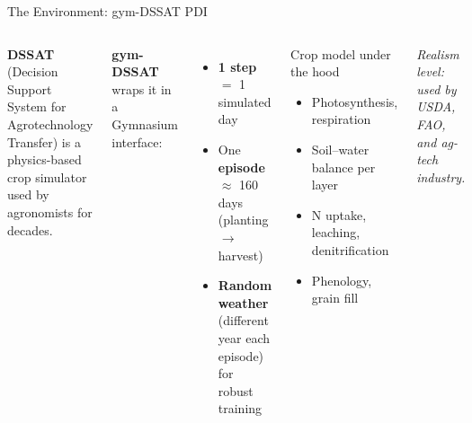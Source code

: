 \documentclass[10pt,aspectratio=169]{beamer}
\newcommand{\strong}[1]{\textbf{\textcolor{cAccent}{#1}}}
\begin{document}
\begin{frame}{The Environment: gym-DSSAT PDI}
  \begin{columns}[T]
    \textbf{DSSAT} (Decision Support System for Agrotechnology Transfer) is a
    physics-based crop simulator used by agronomists for decades.

    \vspace{0.6em}
    \textbf{gym-DSSAT} wraps it in a Gymnasium interface:
    \begin{itemize}
      \item \textbf{1 step} $=$ 1 simulated day
      \item One \textbf{episode} $\approx$ 160 days (planting $\to$ harvest)
      \item \strong{Random weather} (different year each episode) for robust training
    \end{itemize}

    \begin{block}{Crop model under the hood}
    \begin{itemize}\small
      \item Photosynthesis, respiration
      \item Soil--water balance per layer
      \item N uptake, leaching, denitrification
      \item Phenology, grain fill
    \end{itemize}
    \end{block}
    \textit{Realism level: used by USDA, FAO,
    and ag-tech industry.}
  \end{columns}
\end{frame}
\end{document}
